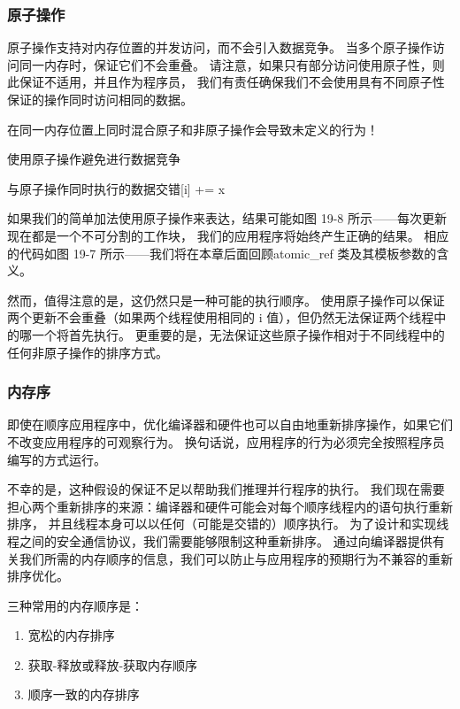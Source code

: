 \subsubsection{原子操作}
原子操作支持对内存位置的并发访问，而不会引入数据竞争。 当多个原子操作访问同一内存时，保证它们不会重叠。 
请注意，如果只有部分访问使用原子性，则此保证不适用，并且作为程序员，
我们有责任确保我们不会使用具有不同原子性保证的操作同时访问相同的数据。

\begin{remark}
	在同一内存位置上同时混合原子和非原子操作会导致未定义的行为！
\end{remark}

{\color{red} 使用原子操作避免进行数据竞争}

{\color{red} 与原子操作同时执行的数据交错[i] += x}

如果我们的简单加法使用原子操作来表达，结果可能如图 19-8 所示——每次更新现在都是一个不可分割的工作块，
我们的应用程序将始终产生正确的结果。 
相应的代码如图 19-7 所示——我们将在本章后面回顾atomic\_ref 类及其模板参数的含义。

然而，值得注意的是，这仍然只是一种可能的执行顺序。 
使用原子操作可以保证两个更新不会重叠（如果两个线程使用相同的 i 值），但仍然无法保证两个线程中的哪一个将首先执行。 
更重要的是，无法保证这些原子操作相对于不同线程中的任何非原子操作的排序方式。

\subsubsection{内存序}
即使在顺序应用程序中，优化编译器和硬件也可以自由地重新排序操作，如果它们不改变应用程序的可观察行为。 
换句话说，应用程序的行为必须完全按照程序员编写的方式运行。

不幸的是，这种假设的保证不足以帮助我们推理并行程序的执行。 
我们现在需要担心两个重新排序的来源：编译器和硬件可能会对每个顺序线程内的语句执行重新排序，
并且线程本身可以以任何（可能是交错的）顺序执行。 
为了设计和实现线程之间的安全通信协议，我们需要能够限制这种重新排序。 
通过向编译器提供有关我们所需的内存顺序的信息，我们可以防止与应用程序的预期行为不兼容的重新排序优化。

三种常用的内存顺序是：

\begin{enumerate}
	\item 宽松的内存排序

	\item 获取-释放或释放-获取内存顺序

	\item 顺序一致的内存排序
\end{enumerate}

